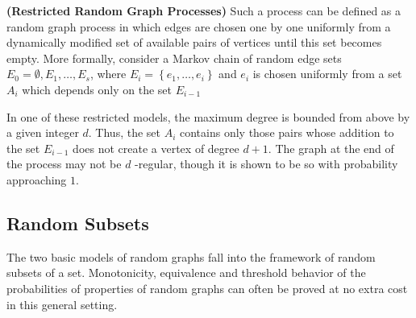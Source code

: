 \documentclass{article}
\newcommand{\bfs}[1]{\textbf{({#1}) }}
\begin{document}
 \begin{defa}{\bfs{Restricted Random Graph Processes}}
Such a process can be defined as a random graph process in which edges are chosen one by one uniformly from a dynamically modified set of available pairs of vertices until this set becomes empty. More formally, consider a Markov chain of random edge sets $E_{0}=\emptyset, E_{1}, \ldots, E_{s}$, where $E_{i}=\left\{e_{1}, \ldots, e_{i}\right\}$ and $e_{i}$ is chosen uniformly from a set $A_{i}$ which depends only on the set $E_{i-1}$
 \end{defa}
\begin{exma}
 In one of these restricted models, the maximum degree is bounded from above by a given integer $d$. Thus, the set $A_{i}$ contains only those pairs whose addition to the set $E_{i-1}$ does not create a vertex of degree $d+1 .$ The graph at the end of the process may not be $d$ -regular, though it is shown to be so with probability approaching $1 .$
\end{exma}

\subsection{Random Subsets}\label{subsecransub}
The two basic models of random graphs fall into the framework of random subsets of a set. Monotonicity, equivalence and threshold behavior of the probabilities of properties of random graphs can often be proved at no extra cost in this general setting. 
\end{document}
